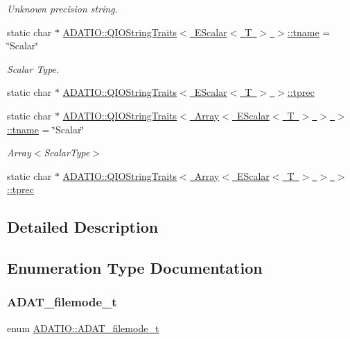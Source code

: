 \begin{DoxyCompactItemize}
\begin{DoxyCompactList}\small\item\em Unknown precision string. \end{DoxyCompactList}\item 
static char $\ast$ \mbox{\hyperlink{group__qio_gaf5e0f914e1c7e78a69472bffe5e470b7}{A\+D\+A\+T\+I\+O\+::\+Q\+I\+O\+String\+Traits$<$ E\+Scalar$<$ T $>$ $>$\+::tname}} = \char`\"{}Scalar\char`\"{}
\begin{DoxyCompactList}\small\item\em Scalar Type. \end{DoxyCompactList}\item 
static char $\ast$ \mbox{\hyperlink{group__qio_ga3fb5d4202ab2a67bf71bdcc4de33b02d}{A\+D\+A\+T\+I\+O\+::\+Q\+I\+O\+String\+Traits$<$ E\+Scalar$<$ T $>$ $>$\+::tprec}}
\item 
static char $\ast$ \mbox{\hyperlink{group__qio_gab84af1dfbd36e1ce7eebd1603b371727}{A\+D\+A\+T\+I\+O\+::\+Q\+I\+O\+String\+Traits$<$ Array$<$ E\+Scalar$<$ T $>$ $>$ $>$\+::tname}} = \char`\"{}Scalar\char`\"{}
\begin{DoxyCompactList}\small\item\em Array$<$\+Scalar\+Type$>$ \end{DoxyCompactList}\item 
static char $\ast$ \mbox{\hyperlink{group__qio_ga6aa642ed522f9f49dc8a9eae8abd273a}{A\+D\+A\+T\+I\+O\+::\+Q\+I\+O\+String\+Traits$<$ Array$<$ E\+Scalar$<$ T $>$ $>$ $>$\+::tprec}}
\end{DoxyCompactItemize}


\subsection{Detailed Description}


\subsection{Enumeration Type Documentation}
\mbox{\label{group__qio_ga669520ca9003997be838730beef322b4}} 
\subsubsection{\texorpdfstring{ADAT\_filemode\_t}{ADAT\_filemode\_t}\hspace{0.1cm}{\footnotesize\ttfamily [1/2]}}
{\footnotesize\ttfamily enum \mbox{\hyperlink{group__qio_ga669520ca9003997be838730beef322b4}{A\+D\+A\+T\+I\+O\+::\+A\+D\+A\+T\+\_\+filemode\+\_\+t}}}



